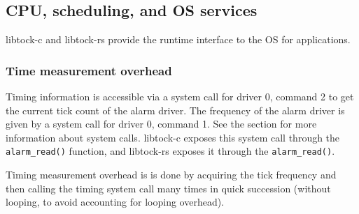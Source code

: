 \documentclass{article}
\begin{document}
\subsection{CPU, scheduling, and OS services}


libtock-c and libtock-rs provide the runtime interface to the OS for applications.

\subsubsection{Time measurement overhead}

Timing information is accessible via a system call for driver 0, command 2 to get the current tick count of the alarm driver. The frequency of the alarm driver is given by a system call for driver 0, command 1. See the  section for more information about system calls. libtock-c exposes this system call through the \texttt{alarm\_read()} function, and libtock-rs exposes it through the \texttt{alarm\_read()}.

Timing measurement overhead is is done by acquiring the tick frequency and then calling the timing system call many times in quick succession (without looping, to avoid accounting for looping overhead).
\end{document}
